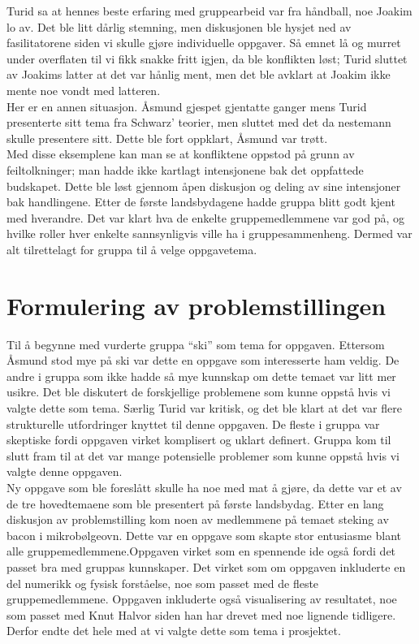 Turid sa at hennes beste erfaring med gruppearbeid var fra håndball, noe Joakim
lo av. Det ble litt dårlig stemning, men diskusjonen ble hysjet ned av
fasilitatorene siden vi skulle gjøre individuelle oppgaver. Så emnet lå og
murret under overflaten til vi fikk snakke fritt igjen, da ble konflikten løst;
Turid sluttet av Joakims latter at det var hånlig ment, men det ble avklart at
Joakim ikke mente noe vondt med latteren.\\

Her er en annen situasjon. Åsmund gjespet gjentatte ganger mens Turid
presenterte sitt tema fra Schwarz’ teorier, men sluttet med det da nestemann
skulle presentere sitt.  Dette ble fort oppklart, Åsmund var trøtt.\\

Med disse eksemplene kan man se at konfliktene oppstod på grunn av
feiltolkninger; man hadde ikke kartlagt intensjonene bak det oppfattede
budskapet. Dette ble løst gjennom åpen diskusjon og deling av sine intensjoner
bak handlingene.  Etter de første landsbydagene hadde gruppa blitt godt kjent
med hverandre. Det var klart hva de enkelte gruppemedlemmene var god på, og
hvilke roller hver enkelte sannsynligvis ville ha i gruppesammenheng. Dermed var
alt tilrettelagt for gruppa til å velge oppgavetema.\\

\section{Formulering av problemstillingen}
Til å begynne med vurderte gruppa ``ski'' som tema for oppgaven. Ettersom Åsmund
stod mye på ski var dette en oppgave som interesserte ham veldig. De andre i
gruppa som ikke hadde så mye kunnskap om dette temaet var litt mer usikre. Det
ble diskutert de forskjellige problemene som kunne oppstå hvis vi valgte dette
som tema. Særlig Turid var kritisk, og det ble klart at det var flere
strukturelle utfordringer knyttet til denne oppgaven. De fleste i gruppa var
skeptiske fordi oppgaven virket komplisert og uklart definert. Gruppa kom til
slutt fram til at det var mange potensielle problemer som kunne oppstå hvis vi
valgte denne oppgaven.\\

Ny oppgave som ble foreslått skulle ha noe med mat å gjøre, da dette var et av
de tre hovedtemaene som ble presentert på første landsbydag. Etter en lang
diskusjon av problemstilling kom noen av medlemmene på temaet steking av bacon i
mikrobølgeovn. Dette var en oppgave som skapte stor entusiasme blant alle                    %
gruppemedlemmene.Oppgaven virket som en spennende ide også fordi det
passet bra med gruppas kunnskaper. Det virket som om oppgaven inkluderte en del
numerikk og fysisk forståelse, noe som passet med de fleste gruppemedlemmene.
Oppgaven inkluderte også visualisering av resultatet, noe som passet med Knut
Halvor siden han har drevet med noe lignende tidligere. Derfor endte det hele
med at vi valgte dette som tema i prosjektet.\\

